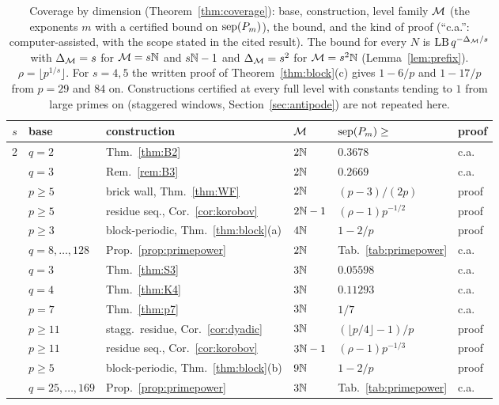 \begin{table}[t]
\centering
\footnotesize
\caption{Coverage by dimension (Theorem~\ref{thm:coverage}): base, construction, level family $\mathcal{M}$ (the exponents $m$ with a certified bound on $\operatorname{sep}(P_m)$), the bound, and the kind of proof (``c.a.'': computer-assisted, with the scope stated in the cited result). The bound for every $N$ is $\mathrm{LB}\,q^{-\Delta_{\mathcal{M}}/s}$ with $\Delta_{\mathcal{M}}=s$ for $\mathcal{M}=s\mathbb{N}$ and $s\mathbb{N}-1$ and $\Delta_{\mathcal{M}}=s^2$ for $\mathcal{M}=s^2\mathbb{N}$ (Lemma~\ref{lem:prefix}). $\rho=\lfloor p^{1/s}\rfloor$. For $s=4,5$ the written proof of Theorem~\ref{thm:block}(c) gives $1-6/p$ and $1-17/p$ from $p=29$ and $84$ on. Constructions certified at every full level with constants tending to $1$ from large primes on (staggered windows, Section~\ref{sec:antipode}) are not repeated here.}
\label{tab:coverage}
\setlength{\tabcolsep}{3pt}
\begin{tabular}{@{}c l l l l l@{}}
\toprule
$s$ & base & construction & $\mathcal{M}$ & $\operatorname{sep}(P_m)\ge$ & proof\\
\midrule
2 & $q=2$ & Thm.~\ref{thm:B2} & $2\mathbb{N}$ & $0.3678$ & c.a.\\
 & $q=3$ & Rem.~\ref{rem:B3} & $2\mathbb{N}$ & $0.2669$ & c.a.\\
 & $p\ge5$ & brick wall, Thm.~\ref{thm:WF} & $2\mathbb{N}$ & $(p-3)/(2p)$ & proof\\
 & $p\ge5$ & residue seq., Cor.~\ref{cor:korobov} & $2\mathbb{N}-1$ & $(\rho-1)p^{-1/2}$ & proof\\
 & $p\ge3$ & block-periodic, Thm.~\ref{thm:block}(a) & $4\mathbb{N}$ & $1-2/p$ & proof\\
 & $q=8,\dots,128$ & Prop.~\ref{prop:primepower} & $2\mathbb{N}$ & Tab.~\ref{tab:primepower} & c.a.\\
\addlinespace
3 & $q=3$ & Thm.~\ref{thm:S3} & $3\mathbb{N}$ & $0.05598$ & c.a.\\
 & $q=4$ & Thm.~\ref{thm:K4} & $3\mathbb{N}$ & $0.11293$ & c.a.\\
 & $p=7$ & Thm.~\ref{thm:p7} & $3\mathbb{N}$ & $1/7$ & c.a.\\
 & $p\ge11$ & stagg.\ residue, Cor.~\ref{cor:dyadic} & $3\mathbb{N}$ & $(\lfloor p/4\rfloor-1)/p$ & proof\\
 & $p\ge11$ & residue seq., Cor.~\ref{cor:korobov} & $3\mathbb{N}-1$ & $(\rho-1)p^{-1/3}$ & proof\\
 & $p\ge5$ & block-periodic, Thm.~\ref{thm:block}(b) & $9\mathbb{N}$ & $1-2/p$ & proof\\
 & $q=25,\dots,169$ & Prop.~\ref{prop:primepower} & $3\mathbb{N}$ & Tab.~\ref{tab:primepower} & c.a.\\

\end{tabular}
\end{table}
